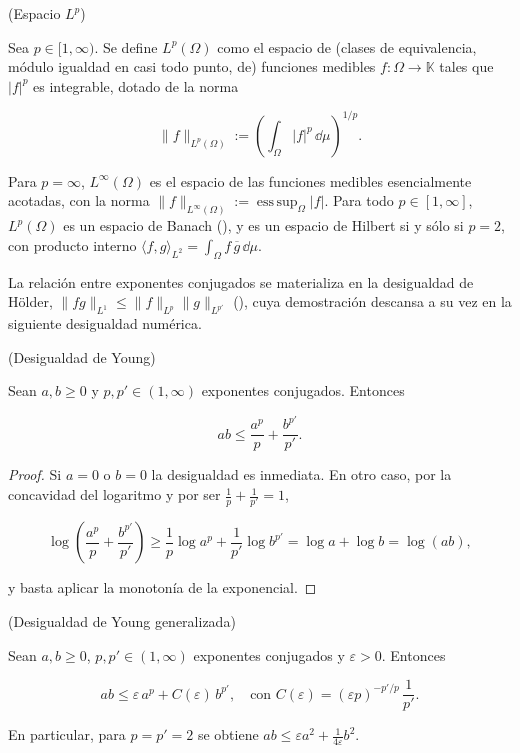 \begin{Definicion}{(Espacio $L^p$)}
\label{ch:preliminares:def:Lp}

Sea $p \in [1, \infty)$. Se define $L^p(\Omega)$ como el espacio de (clases de
equivalencia, módulo igualdad en casi todo punto, de) funciones medibles
$f : \Omega \rightarrow \mathbb{K}$ tales que $|f|^p$ es integrable, dotado de la
norma

\[\lVert f \rVert_{L^p(\Omega)} := \left( \int_\Omega |f|^p \, \dd \mu \right)^{1/p}.\]

Para $p = \infty$, $L^\infty(\Omega)$ es el espacio de las funciones medibles
esencialmente acotadas, con la norma
$\lVert f \rVert_{L^\infty(\Omega)} := \operatorname{ess\,sup}_{\Omega} |f|$. Para
todo $p \in [1, \infty]$, $L^p(\Omega)$ es un espacio de Banach
(\cite[Teorema~4.8]{brezis-2011-fun-ana-sob}), y es un espacio de Hilbert si y
sólo si $p = 2$, con producto interno
$\langle f, g \rangle_{L^2} = \int_\Omega f \, \overline{g} \, \dd \mu$.
\end{Definicion}

La relación entre exponentes conjugados se materializa en la desigualdad de
Hölder, $\lVert fg \rVert_{L^1} \leq \lVert f \rVert_{L^p} \lVert g \rVert_{L^{p'}}$
(\cite[Teorema~4.6]{brezis-2011-fun-ana-sob}), cuya demostración descansa a su vez
en la siguiente desigualdad numérica.\\

\begin{Proposicion}{(Desigualdad de Young)}
\label{ch:preliminares:prop:young}

Sean $a, b \geq 0$ y $p, p' \in (1, \infty)$ exponentes conjugados. Entonces

\[ab \leq \frac{a^p}{p} + \frac{b^{p'}}{p'}.\]
\end{Proposicion}

\begin{proof}
Si $a = 0$ o $b = 0$ la desigualdad es inmediata. En otro caso, por la concavidad
del logaritmo y por ser $\tfrac{1}{p} + \tfrac{1}{p'} = 1$,

\[\log\!\left( \frac{a^p}{p} + \frac{b^{p'}}{p'} \right) \geq \frac{1}{p}\log a^p + \frac{1}{p'}\log b^{p'} = \log a + \log b = \log(ab),\]

y basta aplicar la monotonía de la exponencial.
\end{proof}

\begin{Proposicion}{(Desigualdad de Young generalizada)}
\label{ch:preliminares:prop:youngGen}

Sean $a, b \geq 0$, $p, p' \in (1, \infty)$ exponentes conjugados y
$\varepsilon > 0$. Entonces

\[ab \leq \varepsilon \, a^p + C(\varepsilon) \, b^{p'}, \quad \text{con } C(\varepsilon) = (\varepsilon p)^{-p'/p} \, \frac{1}{p'}.\]

En particular, para $p = p' = 2$ se obtiene
$ab \leq \varepsilon a^2 + \tfrac{1}{4\varepsilon} b^2$.
\end{Proposicion}

